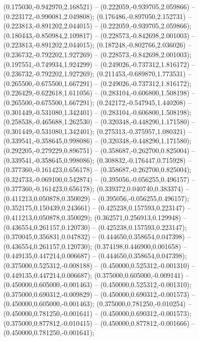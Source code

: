  (0.175030,-0.942970,2.168521) -- (0.222059,-0.939705,2.059866) -- (0.223172,-0.990081,2.049808);
 (0.176486,-0.897050,2.152731) -- (0.223813,-0.891202,2.044015) -- (0.222059,-0.939705,2.059866);
 (0.180443,-0.850984,2.109817) -- (0.228573,-0.842698,2.001003) -- (0.223813,-0.891202,2.044015);
 (0.187248,-0.802766,2.036026) -- (0.236732,-0.792202,1.927269) -- (0.228573,-0.842698,2.001003);
 (0.197551,-0.749934,1.924299) -- (0.249026,-0.737312,1.816172) -- (0.236732,-0.792202,1.927269);
 (0.211453,-0.689870,1.773531) -- (0.265500,-0.675500,1.667291) -- (0.249026,-0.737312,1.816172);
 (0.226429,-0.622618,1.611056) -- (0.283104,-0.606800,1.508198) -- (0.265500,-0.675500,1.667291);
 (0.242172,-0.547945,1.440208) -- (0.301449,-0.531080,1.342401) -- (0.283104,-0.606800,1.508198);
 (0.258538,-0.465688,1.262530) -- (0.320348,-0.448290,1.171580) -- (0.301449,-0.531080,1.342401);
 (0.275313,-0.375957,1.080321) -- (0.339541,-0.358645,0.998086) -- (0.320348,-0.448290,1.171580);
 (0.292205,-0.279229,0.896751) -- (0.358687,-0.262700,0.825004) -- (0.339541,-0.358645,0.998086);
 (0.308832,-0.176447,0.715928) -- (0.377360,-0.161423,0.656178) -- (0.358687,-0.262700,0.825004);
 (0.324733,-0.069100,0.542874) -- (0.395056,-0.056255,0.496157) -- (0.377360,-0.161423,0.656178);
 (0.339372,0.040740,0.383374) -- (0.411213,0.050878,0.350029) -- (0.395056,-0.056255,0.496157);
 (0.352175,0.150439,0.243661) -- (0.425238,0.157593,0.223147) -- (0.411213,0.050878,0.350029);
 (0.362571,0.256913,0.129948) -- (0.436554,0.261157,0.120730) -- (0.425238,0.157593,0.223147);
 (0.370045,0.356831,0.047832) -- (0.444650,0.358654,0.047398) -- (0.436554,0.261157,0.120730);
 (0.374198,0.446900,0.001658) -- (0.449135,0.447214,0.006687) -- (0.444650,0.358654,0.047398);
 (0.375000,0.525312,-0.008188) -- (0.450000,0.525312,-0.001310) -- (0.449135,0.447214,0.006687);
 (0.375000,0.605000,-0.009141) -- (0.450000,0.605000,-0.001463) -- (0.450000,0.525312,-0.001310);
 (0.375000,0.690312,-0.009829) -- (0.450000,0.690312,-0.001573) -- (0.450000,0.605000,-0.001463);
 (0.375000,0.781250,-0.010254) -- (0.450000,0.781250,-0.001641) -- (0.450000,0.690312,-0.001573);
 (0.375000,0.877812,-0.010415) -- (0.450000,0.877812,-0.001666) -- (0.450000,0.781250,-0.001641);
